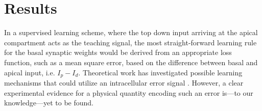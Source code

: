 \documentclass[10pt,a4paper,twocolumn]{article}
\begin{document}
		\section{Results}
		
		In a supervised learning scheme, where the top down input
		arriving at the apical compartment acts as the teaching signal,
		the most straight-forward learning rule for the basal synaptic
		weights would be derived from an appropriate loss function,
		such as a mean square error, based on the difference between 
		basal and apical input, i.e. $I_p - I_d$. Theoretical work has 
		investigated possible learning mechanisms
		that could utilize an intracellular error signal
		\citep{Urbanczik_2014,Schiess_2016,Guerguiev_2017}.
		However, a clear experimental
		evidence for a physical quantity encoding such an error 
		is---to our knowledge---yet to be found.
		
		
		
		
		
		
\end{document}
